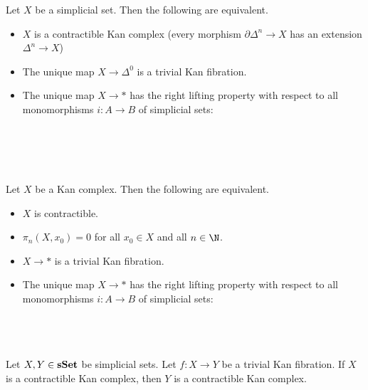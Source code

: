 \documentclass[a4paper]{article}
\begin{document}
\begin{prp}{}{} Let $X$ be a simplicial set. Then the following are equivalent. 
\begin{itemize}
\item $X$ is a contractible Kan complex (every morphism $\partial\Delta^n\to X$ has an extension $\Delta^n\to X$)
\item The unique map $X\to\Delta^0$ is a trivial Kan fibration. 
\item The unique map $X\to\ast$ has the right lifting property with respect to all monomorphisms $i:A\to B$ of simplicial sets: \\~\\
\\~\\
\end{itemize}
\end{prp}

\begin{prp}{}{}\\
Let $X$ be a Kan complex. Then the following are equivalent. 
\begin{itemize}
\item $X$ is contractible. 
\item $\pi_n(X,x_0)=0$ for all $x_0\in X$ and all $n\in\N$. 
\item $X\to\ast$ is a trivial Kan fibration. 
\item The unique map $X\to\ast$ has the right lifting property with respect to all monomorphisms $i:A\to B$ of simplicial sets: \\~\\
\\~\\
\end{itemize}
\end{prp}

\begin{prp}{}{} Let $X,Y\in\bold{sSet}$ be simplicial sets. Let $f:X\to Y$ be a trivial Kan fibration. If $X$ is a contractible Kan complex, then $Y$ is a contractible Kan complex. 
\end{prp}
\end{document}
